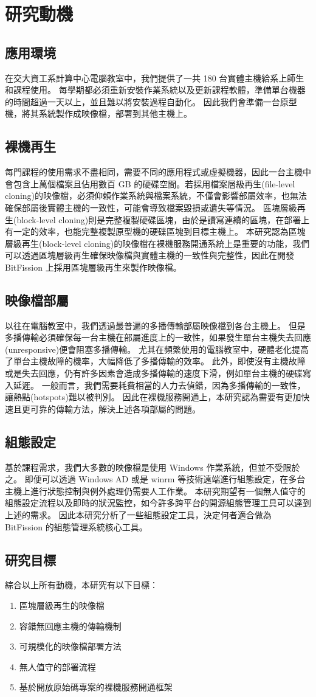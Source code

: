 \chapter{研究動機}
\section{應用環境}
在交大資工系計算中心電腦教室中，我們提供了一共 180 台實體主機給系上師生和課程使用。
每學期都必須重新安裝作業系統以及更新課程軟體，準備單台機器的時間超過一天以上，並且難以將安裝過程自動化。
因此我們會準備一台原型機，將其系統製作成映像檔，部署到其他主機上。
\section{裸機再生}
每門課程的使用需求不盡相同，需要不同的應用程式或虛擬機器，因此一台主機中會包含上萬個檔案且佔用數百 GB 的硬碟空間。若採用檔案層級再生(file-level cloning)的映像檔，必須仰賴作業系統與檔案系統，不僅會影響部屬效率，也無法確保部屬後實體主機的一致性，可能會導致檔案毀損或遺失等情況。
區塊層級再生(block-level cloning)則是完整複製硬碟區塊，由於是讀寫連續的區塊，在部署上有一定的效率，也能完整複製原型機的硬碟區塊到目標主機上。
本研究認為區塊層級再生(block-level cloning)的映像檔在裸機服務開通系統上是重要的功能，我們可以透過區塊層級再生確保映像檔與實體主機的一致性與完整性，因此在開發 BitFission 上採用區塊層級再生來製作映像檔。
\section{映像檔部屬}
以往在電腦教室中，我們透過最普遍的多播傳輸部屬映像檔到各台主機上。
但是多播傳輸必須確保每一台主機在部屬進度上的一致性，如果發生單台主機失去回應(unresponsive)便會阻塞多播傳輸。
尤其在頻繁使用的電腦教室中，硬體老化提高了單台主機故障的機率，大幅降低了多播傳輸的效率。
此外，即使沒有主機故障或是失去回應，仍有許多因素會造成多播傳輸的速度下滑，例如單台主機的硬碟寫入延遲。
一般而言，我們需要耗費相當的人力去偵錯，因為多播傳輸的一致性，讓熱點(hotspots)難以被判別。
因此在裸機服務開通上，本研究認為需要有更加快速且更可靠的傳輸方法，解決上述各項部屬的問題。
\section{組態設定}
基於課程需求，我們大多數的映像檔是使用 Windows 作業系統，但並不受限於之。
即便可以透過 Windows AD 或是 winrm 等技術遠端進行組態設定，在多台主機上進行狀態控制與例外處理仍需要人工作業。
本研究期望有一個無人值守的組態設定流程以及即時的狀況監控，如今許多跨平台的開源組態管理工具可以達到上述的需求。
因此本研究分析了一些組態設定工具，決定何者適合做為 BitFission 的組態管理系統核心工具。

\section{研究目標}
綜合以上所有動機，本研究有以下目標：
\begin{enumerate}
\item 區塊層級再生的映像檔
\item 容錯無回應主機的傳輸機制
\item 可規模化的映像檔部署方法
\item 無人值守的部署流程
\item 基於開放原始碼專案的裸機服務開通框架
\end{enumerate}

